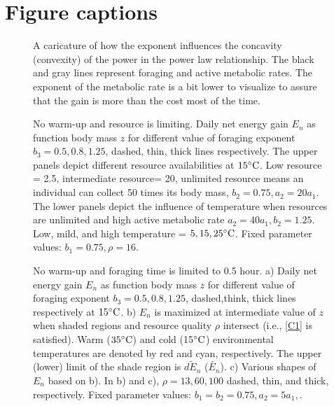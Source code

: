 \section*{Figure captions}
\begin{figure}[H]
\begin{center}
\caption{
	A caricature of how the exponent influences the concavity (convexity) of the power in the power law relationship.
	The black and gray lines represent foraging and active metabolic rates.
	The exponent of the metabolic rate is a bit lower to visualize to assure that the gain is more than the cost most of the time.
}
\label{fig1}
\end{center}
\end{figure}
\vspace{-1.5cm}
%
\begin{figure}[H]
\begin{center}
\caption{
	No warm-up and resource is limiting.
	Daily net energy gain  $E_n$ as function body mass $z$ for different value of foraging exponent $b_3 = 0.5, 0.8, 1.25$, dashed, thin, thick lines respectively.
	The upper panels depict different resource availabilities at $15 ^{\circ} \rm{C}$. 
	Low resource = 2.5, intermediate resource= 20, unlimited resource means an individual can collect 50 times its body mass, $b_2 = 0.75, a_2 = 20 a_1$. 
	The lower panels depict the influence of temperature when resources are unlimited and high active metabolic rate $a_2 = 40 a_1, b_2  = 1.25$.
	Low, mild, and high temperature = $5, 15, 25^{\circ} \rm{C}$.
	Fixed parameter values: $b_1 = 0.75, \rho = 16$.
}
\label{fig2}
\end{center}
\end{figure}
\vspace{-1.5cm}
%
\begin{figure}[H]
\begin{center}
\caption{
	No warm-up and foraging time is limited to 0.5 hour.
	a) Daily net energy gain  $E_n$ as function body mass $z$ for different value of foraging exponent $b_3 = 0.5, 0.8, 1.25$, dashed,think, thick lines respectively  at $15 ^{\circ} \rm{C}$.
	b) $E_n$ is maximized at intermediate value of $z$  when shaded regions and resource quality $\rho$ intersect (i.e., \cref{C1} is satisfied).
	Warm ($35^{\circ} \rm{C}$) and cold (15$^{\circ} \rm{C}$) environmental temperatures are denoted by red and cyan, respectively.
	The upper (lower) limit of the shade region is $\widetilde{dE_n}$ ($\widetilde{E_n}$).  
	c) Various shapes of $E_n$ based on b).
	In b) and c), $\rho = 13, 60, 100$ dashed, thin, and thick, respectively.
	Fixed parameter values: $b_1 = b_2 = 0.75, a_2 = 5 a_1, $.
}
\label{fig3}
\end{center}
\end{figure}
